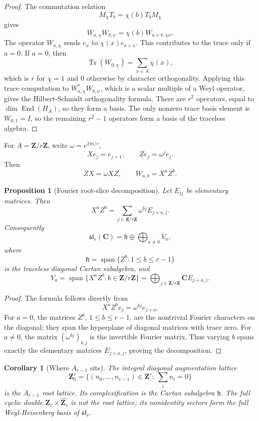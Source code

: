 \documentclass[11pt]{article}
\newcommand{\C}{\mathbf C}
\newcommand{\Z}{\mathbf Z}
\newcommand{\Tr}{\operatorname{Tr}}
\newcommand{\End}{\operatorname{End}}
\newcommand{\Span}{\operatorname{span}}
\theoremstyle{plain}
\newtheorem{proposition}[theorem]{Proposition}
\newtheorem{corollary}[theorem]{Corollary}
\theoremstyle{definition}
\begin{document}
\begin{proof}
The commutation relation
\[
   M_\chi T_b=\chi(b)T_bM_\chi
\]
gives
\[
   W_{a,\chi}W_{b,\psi}=\chi(b)W_{a+b,\chi\psi}.
\]
The operator \(W_{a,\chi}\) sends \(e_x\) to \(\chi(x)e_{a+x}\).  This contributes to the trace only if \(a=0\).  If \(a=0\), then
\[
   \Tr(W_{0,\chi})=\sum_{x\in A}\chi(x),
\]
which is \(r\) for \(\chi=1\) and \(0\) otherwise by character orthogonality.  Applying this trace computation to \(W_{a,\chi}^*W_{b,\psi}\), which is a scalar multiple of a Weyl operator, gives the Hilbert-Schmidt orthogonality formula.  There are \(r^2\) operators, equal to \(\dim\End(H_A)\), so they form a basis.  The only nonzero trace basis element is \(W_{0,1}=I\), so the remaining \(r^2-1\) operators form a basis of the traceless algebra.
\end{proof}

For \(A=\Z/r\Z\), write \(\omega=e^{2\pi i/r}\),
\[
   Xe_j=e_{j+1},
   \qquad
   Ze_j=\omega^j e_j.
\]
Then
\[
   ZX=\omega XZ,
   \qquad
   W_{a,b}=X^aZ^b.
\]

\begin{proposition}[Fourier root-slice decomposition]\label{prop:root-slice}
Let \(E_{ij}\) be elementary matrices.  Then
\[
   X^aZ^b=\sum_{j\in\Z/r\Z}\omega^{bj}E_{j+a,j}.
\]
Consequently
\[
   \mathfrak{sl}_r(\C)=\mathfrak h\oplus\bigoplus_{a\ne0}V_a,
\]
where
\[
   \mathfrak h=\Span\{Z^b:1\le b\le r-1\}
\]
is the traceless diagonal Cartan subalgebra, and
\[
   V_a=\Span\{X^aZ^b:b\in\Z/r\Z\}=\bigoplus_{j\in\Z/r\Z}\C E_{j+a,j}.
\]
\end{proposition}

\begin{proof}
The formula follows directly from
\[
   X^aZ^be_j=\omega^{bj}e_{j+a}.
\]
For \(a=0\), the matrices \(Z^b\), \(1\le b\le r-1\), are the nontrivial Fourier characters on the diagonal; they span the hyperplane of diagonal matrices with trace zero.  For \(a\ne0\), the matrix \((\omega^{bj})_{b,j}\) is the invertible Fourier matrix.  Thus varying \(b\) spans exactly the elementary matrices \(E_{j+a,j}\), proving the decomposition.
\end{proof}

\begin{corollary}[Where \(A_{r-1}\) sits]\label{cor:A-root-sits}
The integral diagonal augmentation lattice
\[
   \Z_0^r=\{(n_0,\ldots,n_{r-1})\in\Z^r:\ \sum_i n_i=0\}
\]
is the \(A_{r-1}\) root lattice.  Its complexification is the Cartan subalgebra \(\mathfrak h\).  The full cyclic double \(\Z_r\times\widehat{\Z_r}\) is not the root lattice; its nonidentity sectors form the full Weyl-Heisenberg basis of \(\mathfrak{sl}_r\).
\end{corollary}
\end{document}
